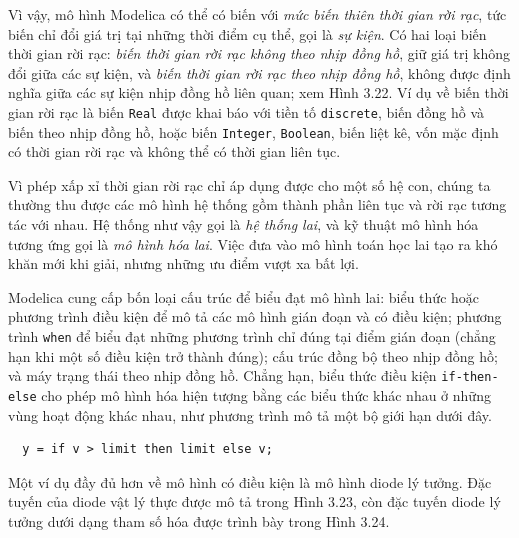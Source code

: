 Vì vậy, mô hình Modelica có thể có biến với \emph{mức biến thiên thời gian rời rạc}, tức biến chỉ đổi giá trị tại những thời điểm cụ thể, gọi là \emph{sự kiện}. Có hai loại biến thời gian rời rạc: \emph{biến thời gian rời rạc không theo nhịp đồng hồ}, giữ giá trị không đổi giữa các sự kiện, và \emph{biến thời gian rời rạc theo nhịp đồng hồ}, không được định nghĩa giữa các sự kiện nhịp đồng hồ liên quan; xem Hình 3.22. Ví dụ về biến thời gian rời rạc là biến \texttt{Real} được khai báo với tiền tố \texttt{discrete}, biến đồng hồ và biến theo nhịp đồng hồ,
hoặc biến \texttt{Integer}, \texttt{Boolean}, biến liệt kê, vốn mặc định có thời gian rời rạc và không thể có thời gian liên tục.

Vì phép xấp xỉ thời gian rời rạc chỉ áp dụng được cho một số hệ con, chúng ta thường thu được các mô hình hệ thống gồm thành phần liên tục và rời rạc tương tác với nhau. Hệ thống như vậy gọi là \emph{hệ thống lai}, và kỹ thuật mô hình hóa tương ứng gọi là \emph{mô hình hóa lai}. Việc đưa vào mô hình toán học lai tạo ra khó khăn mới khi giải, nhưng những ưu điểm vượt xa bất lợi.

Modelica cung cấp bốn loại cấu trúc để biểu đạt mô hình lai: biểu thức hoặc phương trình điều kiện để mô tả các mô hình gián đoạn và có điều kiện; phương trình \texttt{when} để biểu đạt những phương trình chỉ đúng tại điểm gián đoạn (chẳng hạn khi một số điều kiện trở thành đúng); cấu trúc đồng bộ theo nhịp đồng hồ; và máy trạng thái theo nhịp đồng hồ. Chẳng hạn, biểu thức điều kiện \texttt{if-then-else} cho phép mô hình hóa hiện tượng bằng các biểu thức khác nhau ở những vùng hoạt động khác nhau, như phương trình mô tả một bộ giới hạn dưới đây.
\begin{verbatim}
  y = if v > limit then limit else v;
\end{verbatim}
Một ví dụ đầy đủ hơn về mô hình có điều kiện là mô hình diode lý tưởng. Đặc tuyến của diode vật lý thực được mô tả trong Hình 3.23, còn đặc tuyến diode lý tưởng dưới dạng tham số hóa được trình bày trong Hình 3.24.

